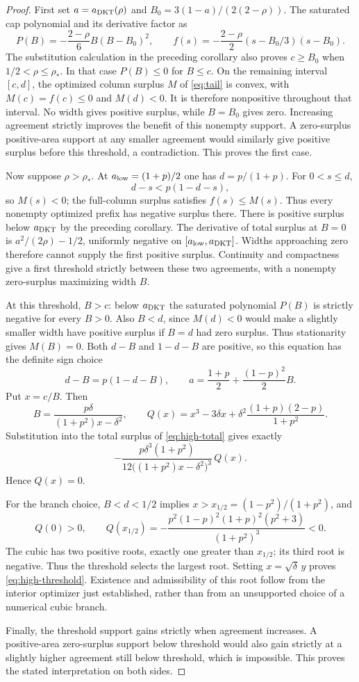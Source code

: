 \begin{proof}
First set $a=a_{\rm DKT}(\rho)$ and
$B_0=3(1-a)/(2(2-\rho))$. The saturated cap polynomial and its derivative
factor as
\[
 P(B)=-\frac{2-\rho}{6}B(B-B_0)^2,
 \qquad f(s)=-\frac{2-\rho}{2}(s-B_0/3)(s-B_0).
\]
The substitution calculation in the preceding corollary also proves
$c\ge B_0$ when $1/2<\rho\le\rho_*$. In that case $P(B)\le0$ for
$B\le c$. On the remaining interval $[c,d]$, the optimized column
surplus $M$ of \eqref{eq:tail} is convex, with
$M(c)=f(c)\le0$ and $M(d)<0$. It is therefore nonpositive throughout
that interval. No width gives positive surplus, while $B=B_0$ gives
zero. Increasing agreement strictly improves the benefit of this
nonempty support. A zero-surplus positive-area support at any smaller
agreement would similarly give positive surplus before this threshold,
a contradiction. This proves the first case.

Now suppose $\rho>\rho_*$. At $a_{\rm low}=(1+p)/2$ one has
$d=p/(1+p)$. For $0<s\le d$,
\[
 d-s<p(1-d-s),
\]
so $M(s)<0$; the full-column surplus satisfies $f(s)\le M(s)$.
Thus every nonempty optimized prefix has negative surplus there.
There is positive surplus below $a_{\rm DKT}$ by the preceding
corollary. The derivative of total surplus at $B=0$ is
$a^2/(2\rho)-1/2$, uniformly negative on
$[a_{\rm low},a_{\rm DKT}]$. Widths approaching zero therefore cannot
supply the first positive surplus. Continuity and compactness give a
first threshold strictly between these two agreements, with a
nonempty zero-surplus maximizing width $B$.

At this threshold, $B>c$: below $a_{\rm DKT}$ the saturated polynomial
$P(B)$ is strictly negative for every $B>0$. Also $B<d$, since
$M(d)<0$ would make a slightly smaller width have positive surplus if
$B=d$ had zero surplus. Thus stationarity gives $M(B)=0$.
Both $d-B$ and $1-d-B$ are positive, so this equation has the definite
sign choice
\[
 d-B=p(1-d-B),\qquad
 a=\frac{1+p}{2}+\frac{(1-p)^2}{2}B.
\]
Put $x=c/B$. Then
\[
 B=\frac{p\delta}{(1+p^2)x-\delta^2},\qquad
 Q(x)=x^3-3\delta x+
        \delta^2\frac{(1+p)(2-p)}{1+p^2}.
\]
Substitution into the total surplus of \eqref{eq:high-total} gives exactly
\[
 -\frac{p\delta^3(1+p^2)}
 {12\bigl((1+p^2)x-\delta^2\bigr)^3}\,Q(x).
\]
Hence $Q(x)=0$.

For the branch choice, $B<d<1/2$ implies
$x>x_{1/2}=(1-p^2)/(1+p^2)$, and
\[
 Q(0)>0,\qquad
 Q(x_{1/2})=-\frac{p^2(1-p)^2(1+p)^2(p^2+3)}{(1+p^2)^3}<0.
\]
The cubic has two positive roots, exactly one greater than $x_{1/2}$;
its third root is negative. Thus the threshold selects the largest
root. Setting $x=\sqrt\delta\,y$ proves
\eqref{eq:high-threshold}. Existence and admissibility of this root
follow from the interior optimizer just established, rather than from
an unsupported choice of a numerical cubic branch.

Finally, the threshold support gains strictly when agreement increases.
A positive-area zero-surplus support below threshold would also gain
strictly at a slightly higher agreement still below threshold, which
is impossible. This proves the stated interpretation on both sides.
\end{proof}

